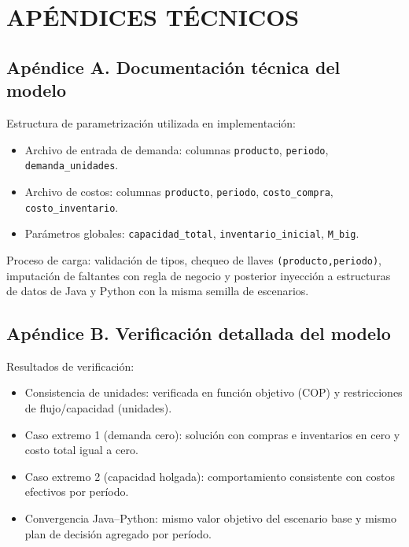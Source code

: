 \documentclass[12pt,letterpaper]{article}
\begin{document}
\newpage
\section*{APÉNDICES TÉCNICOS}

\subsection*{Apéndice A. Documentación técnica del modelo}
Estructura de parametrización utilizada en implementación:
\begin{itemize}[leftmargin=*]
	\item Archivo de entrada de demanda: columnas \texttt{producto}, \texttt{periodo}, \texttt{demanda\_unidades}.
	\item Archivo de costos: columnas \texttt{producto}, \texttt{periodo}, \texttt{costo\_compra}, \texttt{costo\_inventario}.
	\item Parámetros globales: \texttt{capacidad\_total}, \texttt{inventario\_inicial}, \texttt{M\_big}.
\end{itemize}
Proceso de carga: validación de tipos, chequeo de llaves \texttt{(producto,periodo)}, imputación de faltantes con regla de negocio y posterior inyección a estructuras de datos de Java y Python con la misma semilla de escenarios.

\subsection*{Apéndice B. Verificación detallada del modelo}
Resultados de verificación:
\begin{itemize}[leftmargin=*]
	\item Consistencia de unidades: verificada en función objetivo (COP) y restricciones de flujo/capacidad (unidades).
	\item Caso extremo 1 (demanda cero): solución con compras e inventarios en cero y costo total igual a cero.
	\item Caso extremo 2 (capacidad holgada): comportamiento consistente con costos efectivos por período.
	\item Convergencia Java--Python: mismo valor objetivo del escenario base y mismo plan de decisión agregado por período.
\end{itemize}
\end{document}
